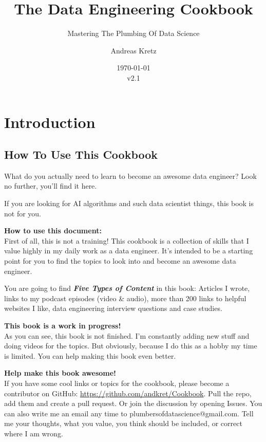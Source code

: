 \documentclass[12pt, numbers=noenddot]{scrreprt} %
\title{The Data Engineering Cookbook}
\subtitle{Mastering The Plumbing Of Data Science}
\author{Andreas Kretz}
\date{\today\\v2.1}
\begin{document}
\maketitle


\pagebreak

\setcounter{tocdepth}{3}
\tableofcontents

\pagebreak

\part{Introduction}
\chapter{How To Use This Cookbook}
What do you actually need to learn to become an awesome data engineer?
Look no further, you'll find it here. 

If you are looking for AI algorithms and such data scientist things, this book is not for you.

\textbf{How to use this document:} \\ 
First of all, this is not a training! This cookbook is a collection of skills that I value highly in my daily work as a data engineer. It's intended to be a starting point for you to find the topics to look into and become an awesome data engineer.

You are going to find \textbf{\textit{Five Types of Content}} in this book: Articles I wrote, links to my podcast episodes (video \& audio), more than 200 links to helpful websites I like, data engineering interview questions and case studies. 

\textbf{This book is a work in progress!} \\
As you can see, this book is not finished. I'm constantly adding new stuff and doing videos for the topics. But obviously, because I do this as a hobby my time is limited. You can help making this book even better.

\textbf{Help make this book awesome!}\\
If you have some cool links or topics for the cookbook, please become a contributor on GitHub: \url{https://github.com/andkret/Cookbook}. Pull the repo, add them and create a pull request. Or join the discussion by opening Issues.
You can also write me an email any time to plumbersofdatascience@gmail.com. Tell me your thoughts, what you value, you think should be included, or correct where I am wrong.
\end{document}
